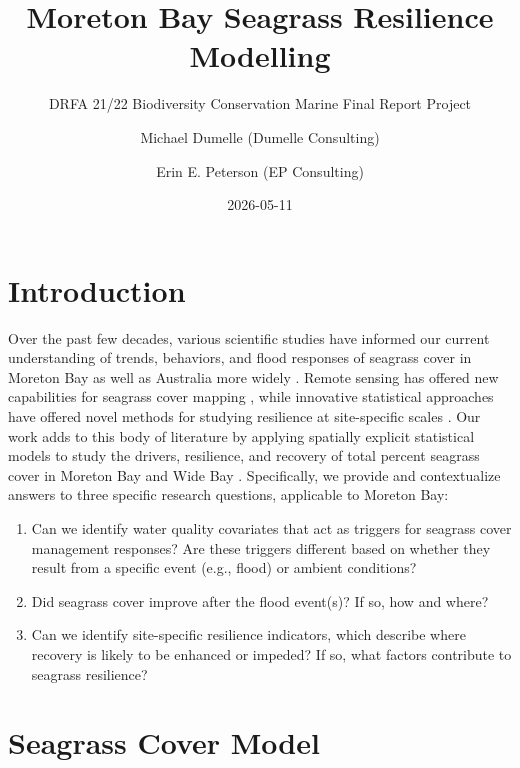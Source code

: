 \documentclass[
  letterpaper,
  DIV=11,
  numbers=noendperiod]{scrartcl}
\title{Moreton Bay Seagrass Resilience Modelling}
\subtitle{DRFA 21/22 Biodiversity Conservation Marine Final Report
Project}
\author{Michael Dumelle (Dumelle Consulting) \and Erin E. Peterson (EP
Consulting)}
\date{2026-05-11}
\providecommand{\tightlist}{%
  \setlength{\itemsep}{0pt}\setlength{\parskip}{0pt}}
\renewcommand*\contentsname{Table of contents}
\newcommand\contentsname{Table of contents}
\begin{document}
\maketitle

\renewcommand*\contentsname{Table of contents}
{
\hypersetup{linkcolor=}
\setcounter{tocdepth}{3}
\tableofcontents
}

\section{Introduction}\label{introduction}

Over the past few decades, various scientific studies have informed our
current understanding of trends, behaviors, and flood responses of
seagrass cover in Moreton Bay
\citep{abal1996seagrass, udy1997growth, samper2016organic, ovsyanikova2026spatial}
as well as Australia more widely
\citep{kilminster2015unravelling, gilby2018seagrass, o2018seagrass}.
Remote sensing has offered new capabilities for seagrass cover mapping
\citep{roelfsema2009integrated}, while innovative statistical approaches
have offered novel methods for studying resilience at site-specific
scales \citep{gilby2023drivers}. Our work adds to this body of
literature by applying spatially explicit statistical models
\citep{cressie1993statistics} to study the drivers, resilience, and
recovery of total percent seagrass cover in Moreton Bay and Wide Bay
\citep{dumelle2026wide}. Specifically, we provide and contextualize
answers to three specific research questions, applicable to Moreton Bay:

\begin{enumerate}
\def\labelenumi{\arabic{enumi}.}
\tightlist
\item
  Can we identify water quality covariates that act as triggers for
  seagrass cover management responses? Are these triggers different
  based on whether they result from a specific event (e.g., flood) or
  ambient conditions?
\item
  Did seagrass cover improve after the flood event(s)? If so, how and
  where?
\item
  Can we identify site-specific resilience indicators, which describe
  where recovery is likely to be enhanced or impeded? If so, what
  factors contribute to seagrass resilience?
\end{enumerate}

\section{Seagrass Cover Model}\label{seagrass-cover-model}
\end{document}
